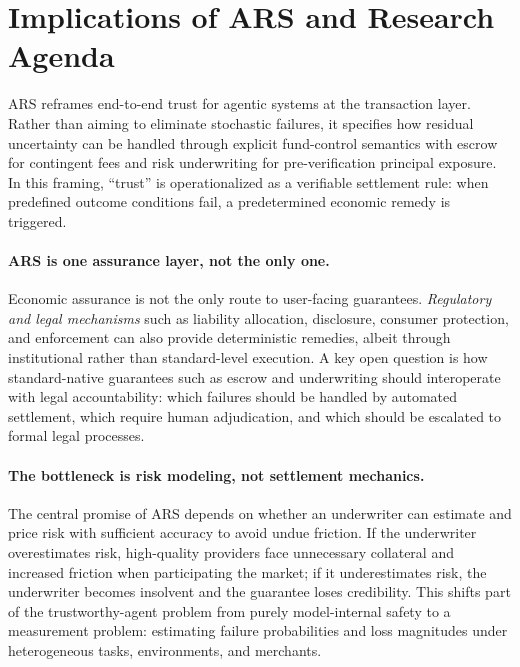\documentclass{article} %
\begin{document}
\section{Implications of \textsc{ARS} and Research Agenda}
\textsc{ARS} reframes end-to-end trust for agentic systems at the transaction layer. Rather than aiming to eliminate stochastic failures, it specifies how residual uncertainty can be handled through explicit fund-control semantics with escrow for contingent fees and risk underwriting for pre-verification principal exposure. In this framing, ``trust'' is operationalized as a verifiable settlement rule: when predefined outcome conditions fail, a predetermined economic remedy is triggered.

\paragraph{ARS is one assurance layer, not the only one.}
Economic assurance is not the only route to user-facing guarantees. \textit{Regulatory and legal mechanisms} such as liability allocation, disclosure, consumer protection, and enforcement can also provide deterministic remedies, albeit through institutional rather than standard-level execution. A key open question is how standard-native guarantees such as escrow and underwriting should interoperate with legal accountability: which failures should be handled by automated settlement, which require human adjudication, and which should be escalated to formal legal processes.

\paragraph{The bottleneck is risk modeling, not settlement mechanics.}
The central promise of \textsc{ARS} depends on whether an underwriter can estimate and price risk with sufficient accuracy to avoid undue friction. If the underwriter overestimates risk, high-quality providers face unnecessary collateral and increased friction when participating the market; if it underestimates risk, the underwriter becomes insolvent and the guarantee loses credibility. This shifts part of the trustworthy-agent problem from purely model-internal safety to a measurement problem: estimating failure probabilities and loss magnitudes under heterogeneous tasks, environments, and merchants.
\end{document}
